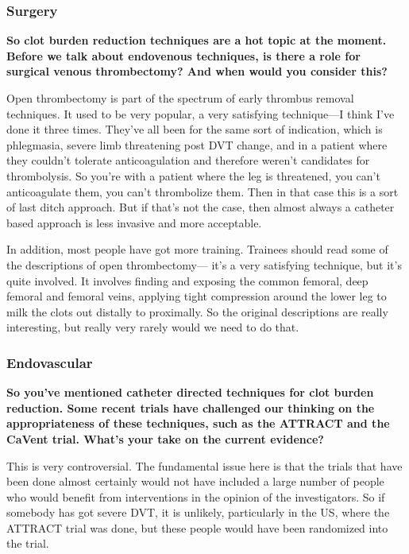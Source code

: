 \documentclass[
]{book}
\begin{document}
\hypertarget{surgery-1}{%
\subsubsection{Surgery}\label{surgery-1}}

\textbf{So clot burden reduction techniques are a hot topic at the moment.
Before we talk about endovenous techniques, is there a role for surgical
venous thrombectomy? And when would you consider this?}

Open thrombectomy is part of the spectrum of early thrombus removal
techniques. It used to be very popular, a very satisfying technique---I
think I've done it three times. They've all been for the same sort of
indication, which is phlegmasia, severe limb threatening post DVT
change, and in a patient where they couldn't tolerate anticoagulation
and therefore weren't candidates for thrombolysis. So you're with a
patient where the leg is threatened, you can't anticoagulate them, you
can't thrombolize them. Then in that case this is a sort of last ditch
approach. But if that's not the case, then almost always a catheter
based approach is less invasive and more acceptable.

In addition, most people have got more training. Trainees should read
some of the descriptions of open thrombectomy--- it's a very satisfying
technique, but it's quite involved. It involves finding and exposing the
common femoral, deep femoral and femoral veins, applying tight
compression around the lower leg to milk the clots out distally to
proximally. So the original descriptions are really interesting, but
really very rarely would we need to do that.\citep{comerota2019}

\hypertarget{endovascular}{%
\subsubsection{Endovascular}\label{endovascular}}

\textbf{So you've mentioned catheter directed techniques for clot burden
reduction. Some recent trials have challenged our thinking on the
appropriateness of these techniques, such as the ATTRACT and the CaVent
trial. What's your take on the current evidence?}

This is very controversial. The fundamental issue here is that the
trials that have been done almost certainly would not have included a
large number of people who would benefit from interventions in the
opinion of the investigators. So if somebody has got severe DVT, it is
unlikely, particularly in the US, where the ATTRACT trial was done, but
these people would have been randomized into the trial.
\end{document}

